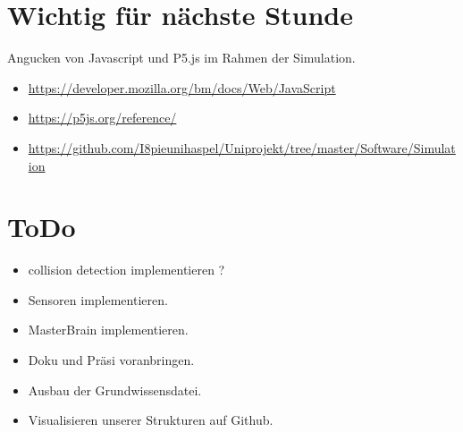 \documentclass{article}
\begin{document}
\section{Wichtig f\"{u}r n\"{a}chste Stunde}

Angucken von Javascript und P5.js im Rahmen der Simulation.

\begin{itemize}

\item \url{https://developer.mozilla.org/bm/docs/Web/JavaScript}

\item \url{https://p5js.org/reference/}

\item \url{https://github.com/I8pieunihaspel/Uniprojekt/tree/master/Software/Simulation}

\end{itemize}

\section{ToDo}

\begin{itemize}

\item collision detection implementieren ?

\item Sensoren implementieren.

\item MasterBrain implementieren.

\item Doku und Pr\"{a}si voranbringen.

\item Ausbau der Grundwissensdatei.

\item Visualisieren unserer Strukturen auf Github.

\end{itemize}
\end{document}

